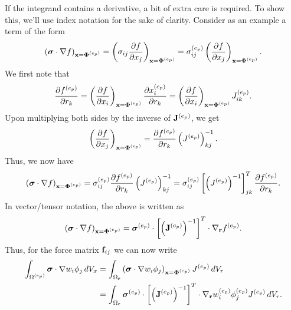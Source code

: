 \documentclass[11pt]{report}
\begin{document}
If the integrand contains a derivative, a bit of extra care is required. To show this, we'll use index notation for the sake of clarity. Consider as an example a term of the form
\begin{equation*}
    \left ( \bm \sigma \cdot \nabla f \right )_{\mathbf{x}=\bm \Phi^{(e_p)}}= \left ( \sigma_{ij} \frac{\partial f}{\partial x_j} \right )_{\mathbf{x} = \bm \Phi^{(e_p)}}= \sigma_{ij}^{(e_p)} \left ( \frac{\partial f}{\partial x_j} \right )_{\mathbf{x} = \bm \Phi^{(e_p)}}.
\end{equation*}
We first note that
\begin{equation*}
    \frac{\partial f^{(e_p)}}{\partial r_k} = \left ( \frac{\partial f}{\partial x_i} \right )_{\mathbf{x} = \bm \Phi^{(e_p)}} \frac{\partial x^{(e_p)}_i}{\partial r_k} = \left ( \frac{\partial f}{\partial x_i} \right )_{\mathbf{x} = \bm \Phi^{(e_p)}} J^{(e_p)}_{ik}.
\end{equation*}
Upon multiplying both sides by the inverse of $\mathbf{J}^{(e_p)}$, we get
\begin{equation*}
    \left ( \frac{\partial f}{\partial x_j} \right )_{\mathbf{x} = \bm \Phi^{(e_p)}} = \frac{\partial f^{(e_p)}}{\partial r_k} \left( J^{(e_p)} \right)^{-1}_{kj}.
\end{equation*}
Thus, we now have
\begin{equation*}
    \left ( \bm \sigma \cdot \nabla f \right )_{\mathbf{x}=\bm \Phi^{(e_p)}} = \sigma^{(e_p)}_{ij}\frac{\partial f^{(e_p)}}{\partial r_k} \left( J^{(e_p)} \right)^{-1}_{kj} = \sigma^{(e_p)}_{ij} \left[ \left( J^{(e_p)} \right)^{-1} \right]^T_{jk} \frac{\partial f^{(e_p)}}{\partial r_k}.
\end{equation*}
In vector/tensor notation, the above is written as
\begin{equation*}
    \left ( \bm \sigma \cdot \nabla f \right )_{\mathbf{x}=\bm \Phi^{(e_p)}} = \bm \sigma^{(e_p)} \cdot \left[ \left( \mathbf{J}^{(e_p)} \right)^{-1} \right]^T \cdot \nabla_{\mathbf{r}} f^{(e_p)}.
\end{equation*}
Thus, for the force matrix $\mathbf{f}_{ij}$ we can now write
\begin{align*}
    \int_{\Omega^{(e_p)}} \bm \sigma \cdot \nabla w_i \phi_j \, dV_x &= \int_{\Omega_{\mathbf{r}}} \left ( \bm \sigma \cdot \nabla w_i \phi_j \right )_{\mathbf{x}=\bm \Phi^{(e_p)}} J^{(e_p)} \, dV_r \nonumber \\
    &= \int_{\Omega_{\mathbf{r}}} \bm \sigma^{(e_p)} \cdot \left[ \left( \mathbf{J}^{(e_p)} \right)^{-1} \right]^T  \cdot \nabla_{\mathbf{r}} w^{(e_p)}_i \phi^{(e_p)}_j J^{(e_p)} \, dV_r.
\end{align*}
\end{document}
